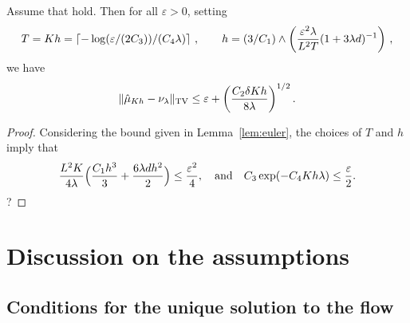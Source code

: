 \begin{cor}
  \label{coro:precision}
  Assume that  hold. Then for all $\varepsilon >0$, setting
  \begin{align}
T = Kh  = \left\lceil -\log(\varepsilon/(2C_3))/(C_4\lambda) \right\rceil \, , \qquad 
h = (3/C_1)\wedge\left(\frac{\varepsilon^2 \lambda}{L^2 T}(1+3\lambda d)^{-1}\right) \,,
  \end{align}
  we have
  \begin{align}
    \| \hat{\mu}_{Kh} - \nu_\lambda \|_{\textnormal{TV}} \leq \varepsilon + \left(\frac{C_2 \delta K h}{8\lambda}\right)^{1/2} . 
  \end{align}
\end{cor}
\begin{proof}
Considering the bound given in Lemma~\ref{lem:euler}, the choices of $T$ and $h$ imply that
\begin{align}
\frac{L^2 K}{4\lambda} \Bigl( \frac{C_1 h^3}{3} + \frac{6 \lambda d h^2}{2} \Bigr) \leq \frac{\varepsilon^2}{4}, \quad \text{and} \quad C_3 \exp(-C_4 Kh \lambda) \leq \frac{\varepsilon}{2}.
\end{align}
?

\end{proof}

\section{Discussion on the assumptions}


\subsection{Conditions for the unique solution to the flow}

